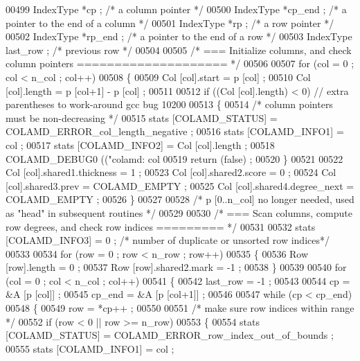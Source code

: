 \begin{DoxyCode}
{{{{{{{00499   IndexType *cp ;     \textcolor{comment}{/* a column pointer */}
00500   IndexType *cp\_end ;   \textcolor{comment}{/* a pointer to the end of a column */}
00501   IndexType *rp ;     \textcolor{comment}{/* a row pointer */}
00502   IndexType *rp\_end ;   \textcolor{comment}{/* a pointer to the end of a row */}
00503   IndexType last\_row ;    \textcolor{comment}{/* previous row */}
00504 
00505   \textcolor{comment}{/* === Initialize columns, and check column pointers ==================== */}
00506 
00507   \textcolor{keywordflow}{for} (col = 0 ; col < n\_col ; col++)
00508   \{
00509     Col [col].start = p [col] ;
00510     Col [col].length = p [col+1] - p [col] ;
00511 
00512     \textcolor{keywordflow}{if} ((Col [col].length) < 0) \textcolor{comment}{// extra parentheses to work-around gcc bug 10200}
00513     \{
00514       \textcolor{comment}{/* column pointers must be non-decreasing */}
00515       stats [COLAMD\_STATUS] = COLAMD\_ERROR\_col\_length\_negative ;
00516       stats [COLAMD\_INFO1] = col ;
00517       stats [COLAMD\_INFO2] = Col [col].length ;
00518       COLAMD\_DEBUG0 ((\textcolor{stringliteral}{"colamd: col %
00519       \textcolor{keywordflow}{return} (\textcolor{keyword}{false}) ;
00520     \}
00521 
00522     Col [col].shared1.thickness = 1 ;
00523     Col [col].shared2.score = 0 ;
00524     Col [col].shared3.prev = COLAMD\_EMPTY ;
00525     Col [col].shared4.degree\_next = COLAMD\_EMPTY ;
00526   \}
00527 
00528   \textcolor{comment}{/* p [0..n\_col] no longer needed, used as "head" in subsequent routines */}
00529 
00530   \textcolor{comment}{/* === Scan columns, compute row degrees, and check row indices ========= */}
00531 
00532   stats [COLAMD\_INFO3] = 0 ;  \textcolor{comment}{/* number of duplicate or unsorted row indices*/}
00533 
00534   \textcolor{keywordflow}{for} (row = 0 ; row < n\_row ; row++)
00535   \{
00536     Row [row].length = 0 ;
00537     Row [row].shared2.mark = -1 ;
00538   \}
00539 
00540   \textcolor{keywordflow}{for} (col = 0 ; col < n\_col ; col++)
00541   \{
00542     last\_row = -1 ;
00543 
00544     cp = &A [p [col]] ;
00545     cp\_end = &A [p [col+1]] ;
00546 
00547     \textcolor{keywordflow}{while} (cp < cp\_end)
00548     \{
00549       row = *cp++ ;
00550 
00551       \textcolor{comment}{/* make sure row indices within range */}
00552       \textcolor{keywordflow}{if} (row < 0 || row >= n\_row)
00553       \{
00554     stats [COLAMD\_STATUS] = COLAMD\_ERROR\_row\_index\_out\_of\_bounds ;
00555     stats [COLAMD\_INFO1] = col ;
}}}}}}}}
\end{DoxyCode}
